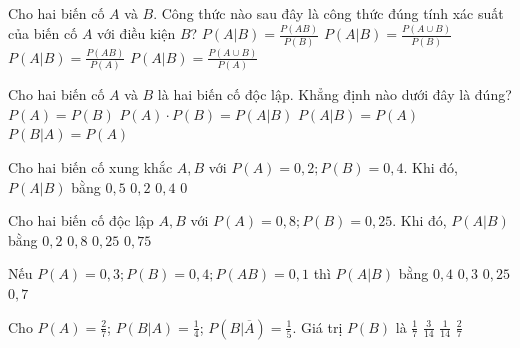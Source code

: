 \subsection{\btrl}
\begin{ex}%
    Cho hai biến cố $A$ và $B$. Công thức nào sau đây là công thức đúng tính xác suất của biến cố $A$ với điều kiện $B$?
    \choice
    {\True $P(A|B) = \frac{P(AB)}{P(B)}$}
    {$P(A|B) = \frac{P(A \cup B)}{P(B)}$}
    {$P(A|B) = \frac{P(AB)}{P(A)}$}
    {$P(A|B) = \frac{P(A \cup B)}{P(A)}$}
\end{ex}
\begin{ex}%
    Cho hai biến cố $A$ và $B$ là hai biến cố độc lập. Khẳng định nào dưới đây là đúng?
    \choice
    {$P(A) = P(B)$}
    {$P(A) \cdot P(B) = P(A|B)$}
    {\True $P(A|B) = P(A)$}
    {$P(B|A) = P(A)$}
\end{ex}
\begin{ex}%
    Cho hai biến cố xung khắc $A, B$ với $P(A) = 0,2; P(B) = 0,4$. Khi đó, $P(A|B)$ bằng
    \choice
    {$0,5$}
    {$0,2$}
    {$0,4$}
    {\True $0$}
\end{ex}
\begin{ex}%
    Cho hai biến cố độc lập $A, B$ với $P(A) = 0,8; P(B) = 0,25$. Khi đó, $P(A|B)$ bằng
    \choice
    {$0,2$}
    {\True $0,8$}
    {$0,25$}
    {$0,75$}
\end{ex}
\begin{ex}%
    Nếu $P(A) = 0,3; P(B) = 0,4; P(AB) = 0,1$ thì $P(A|B)$ bằng
    \choice
    {$0,4$}
    {$0,3$}
    {\True $0,25$}
    {$0,7$}
\end{ex}
\begin{ex}%
    Cho $P(A) = \frac{2}{7}$; $P(B|A) = \frac{1}{4}$; $P(B|\overline{A}) = \frac{1}{5}$. Giá trị $P(B)$ là
    \choice
    {$\frac{1}{7}$}
    {\True $\frac{3}{14}$}
    {$\frac{1}{14}$}
    {$\frac{2}{7}$}
\end{ex}
